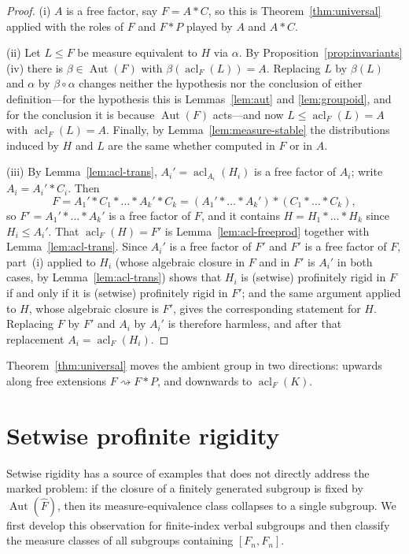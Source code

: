 \documentclass[11pt]{amsart}
\theoremstyle{plain}
\theoremstyle{definition}
\newcommand{\acl}{\operatorname{acl}}
\newcommand{\Aut}{\operatorname{Aut}}
\newcommand{\Fhat}{\widehat{F}}
\begin{document}
\begin{proof}
(i)  $A$ is a free factor, say $F=A*C$, so this is Theorem~\ref{thm:universal}
applied with the roles of $F$ and $F*P$ played by $A$ and $A*C$.

(ii)  Let $L\le F$ be measure equivalent to $H$ via $\alpha$.  By
Proposition~\ref{prop:invariants}(iv) there is $\beta\in\Aut(F)$ with
$\beta(\acl_F(L))=A$.  Replacing $L$ by $\beta(L)$ and $\alpha$ by
$\beta\circ\alpha$ changes neither the hypothesis nor the conclusion of either
definition---for the hypothesis this is Lemmas~\ref{lem:aut} and
\ref{lem:groupoid}, and for the conclusion it is because $\Aut(F)$ acts---and
now $L\le\acl_F(L)=A$ with $\acl_F(L)=A$.  Finally, by
Lemma~\ref{lem:measure-stable} the distributions induced by $H$ and $L$ are the
same whether computed in $F$ or in $A$.

(iii)  By Lemma~\ref{lem:acl-trans}, $A_i'=\acl_{A_i}(H_i)$ is a free factor of
$A_i$; write $A_i=A_i'*C_i$.  Then
\[
  F=A_1'*C_1*\dots*A_k'*C_k=(A_1'*\dots*A_k')*(C_1*\dots*C_k),
\]
so $F'=A_1'*\dots*A_k'$ is a free factor of $F$, and it contains
$H=H_1*\dots*H_k$ since $H_i\le A_i'$.  That $\acl_F(H)=F'$ is
Lemma~\ref{lem:acl-freeprod} together with Lemma~\ref{lem:acl-trans}.  Since
$A_i'$ is a free factor of $F'$ and $F'$ is a free factor of $F$, part~(i)
applied to $H_i$ (whose algebraic closure in $F$ and in $F'$ is $A_i'$ in both
cases, by Lemma~\ref{lem:acl-trans}) shows that $H_i$ is (setwise) profinitely
rigid in $F$ if and only if it is (setwise) profinitely rigid in $F'$; and the
same argument applied to $H$, whose algebraic closure is $F'$, gives the
corresponding statement for $H$.  Replacing $F$ by $F'$ and $A_i$ by $A_i'$ is
therefore harmless, and after that replacement $A_i=\acl_F(H_i)$.
\end{proof}

Theorem~\ref{thm:universal} moves the ambient group in two directions: upwards
along free extensions $F\rightsquigarrow F*P$, and downwards to $\acl_F(K)$. 

\section{Setwise profinite rigidity}\label{sec:setwise-rigid}

Setwise rigidity has a source of examples that does not directly address the
marked problem: if the closure of a finitely generated subgroup is fixed by
$\Aut(\Fhat)$, then its measure-equivalence class collapses to a single
subgroup. We first develop this observation for finite-index verbal subgroups
and then classify the measure classes of all subgroups containing
$[F_n,F_n]$.
\end{document}
